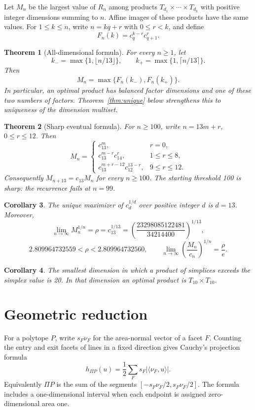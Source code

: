 \documentclass[11pt]{article}
\newtheorem{theorem}{Theorem}[section]
\newtheorem{corollary}[theorem]{Corollary}
\theoremstyle{remark}\newtheorem{remark}[theorem]{Remark}
\begin{document}
Let $M_n$ be the largest value of $R_n$ among products $T_{d_1}\times\cdots\times T_{d_k}$ with positive integer dimensions summing to $n$. Affine images of these products have the same values. For $1\le k\le n$, write $n=kq+r$ with $0\le r<k$, and define
\[
 F_n(k)=c_q^{k-r}c_{q+1}^{r}.
\]

\begin{theorem}[All-dimensional formula]\label{thm:all}
For every $n\ge1$, let
\[
 k_- =\max\{1,\lfloor n/13\rfloor\},\qquad
 k_+ =\max\{1,\lceil n/13\rceil\}.
\]
Then
\[
 \boxed{M_n=\max\{F_n(k_-),F_n(k_+)\}.}
\]
In particular, an optimal product has balanced factor dimensions and one of these two numbers of factors. Theorem~\ref{thm:unique} below strengthens this to uniqueness of the dimension multiset.
\end{theorem}

\begin{theorem}[Sharp eventual formula]\label{thm:residue}
For $n\ge100$, write $n=13m+r$, $0\le r\le12$. Then
\[
 \boxed{M_n=
 \begin{cases}
 c_{13}^{m}, &r=0,\\
 c_{13}^{m-r}c_{14}^{r}, &1\le r\le8,\\
 c_{13}^{m+r-12}c_{12}^{13-r}, &9\le r\le12.
 \end{cases}}
\]
Consequently $M_{n+13}=c_{13}M_n$ for every $n\ge100$. The starting threshold 100 is sharp: the recurrence fails at $n=99$.
\end{theorem}

\begin{corollary}\label{cor:rate}
The unique maximizer of $c_d^{1/d}$ over positive integer $d$ is $d=13$. Moreover,
\[
 \lim_{n\to\infty} M_n^{1/n}
 =\rho=c_{13}^{1/13}
 =\left(\frac{23298085122481}{34214400}\right)^{1/13},
\]
\[
 2.809964732559<\rho<2.809964732560,
 \qquad
 \lim_{n\to\infty}\left(\frac{M_n}{c_n}\right)^{1/n}=\frac\rho e.
\]
\end{corollary}

\begin{corollary}\label{cor:twenty}
The smallest dimension in which a product of simplices exceeds the simplex value is 20. In that dimension an optimal product is $T_{10}\times T_{10}$.
\end{corollary}

\section{Geometric reduction}
For a polytope $P$, write $s_F\nu_F$ for the area-normal vector of a facet $F$. Counting the entry and exit facets of lines in a fixed direction gives Cauchy's projection formula
\[
 h_{\Pi P}(u)=\frac12\sum_Fs_F|\langle\nu_F,u\rangle|.
\]
Equivalently $\Pi P$ is the sum of the segments $[-s_F\nu_F/2,s_F\nu_F/2]$. The formula includes a one-dimensional interval when each endpoint is assigned zero-dimensional area one.
\end{document}
